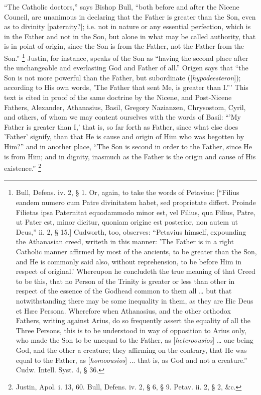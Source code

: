 ``The Catholic doctors,'' says Bishop Bull, ``both
before and after the Nicene Council, are unanimous in declaring that
the Father is greater than the Son, even as to divinity [paternity?];
i.e. not in nature or any essential perfection, which is in the Father
and not in the Son, but alone in what may be called authority, that is in point of origin, since the Son is from the Father, not the
Father from the Son.'' \footnote{Bull, Defens. iv. 2, § 1. Or, again, to
take the words of Petavius: [``Filius eandem numero cum Patre
divinitatem habet, sed proprietate differt. Proinde Filietas ipsa
Paternitat equodammodo minor est, vel Filius, qua Filius, Patre, ut
Pater est, minor dicitur, quoniam origine est posterior, non autem ut
Deus,'' ii. 2, § 15.] Cudworth, too, observes: ``Petavius
himself, expounding the Athanasian creed, writeth in this manner: 'The
Father is in a right Catholic manner affirmed by most of the ancients,
to be greater than the Son, and He is commonly said also, without
reprehension, to be before Him in respect of original.' Whereupon he
concludeth the true meaning of that Creed to be this, that no Person
of the Trinity is greater or less than other in respect of the essence
of the Godhead common to them all … but that notwithstanding there
may be some inequality in them, as they are Hic Deus et Hæc Persona.
Wherefore when Athanasius, and the other orthodox Fathers, writing
against Arius, do so frequently assert the equality of all the Three
Persons, this is to be understood in way of opposition to Arius only,
who made the Son to be unequal to the Father, as [\emph{heteroousios}]
… one being God, and the other a creature; they affirming on the
contrary, that He was equal to the Father, as [\emph{homoousios}] ...
that is, as God and not a creature.'' Cudw. Intell. Syst. 4, § 36.}
Justin, for instance, speaks of the Son as ``having the second
place after the unchangeable and everlasting God and Father of
all.'' Origen says that ``the Son is not more powerful than
the Father, but subordinate ([\emph{hypodeesteron}]); according to His
own words, 'The Father that sent Me, is greater than I.''' This
text is cited in proof of the same doctrine by the Nicene, and
Post-Nicene Fathers, Alexander, Athanasius, Basil, Gregory Nazianzen,
Chrysostom, Cyril, and others, of whom we may content ourselves with
the words of Basil: ``'My Father is greater than I,' that is, so
far forth as Father, since what else does 'Father' signify, than that
He is cause and origin of Him who was begotten by Him?'' and in
another place, ``The Son is second in order to the Father,
since He is from Him; and in dignity, inasmuch as the Father is the
origin and cause of His existence.'' \footnote{Justin, Apol. i. 13, 60. Bull, Defens. iv.
2, § 6, § 9. Petav. ii. 2, § 2, \&c.}

